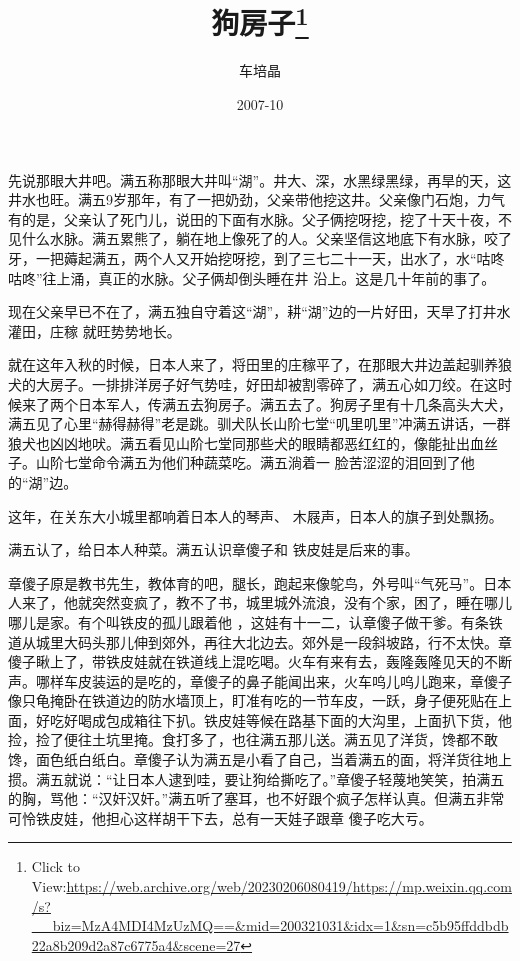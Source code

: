 \documentclass{article}
\title{狗房子\footnote{Click to View:\url{https://web.archive.org/web/20230206080419/https://mp.weixin.qq.com/s?__biz=MzA4MDI4MzUzMQ==&mid=200321031&idx=1&sn=c5b95ffddbdb22a8b209d2a87c6775a4&scene=27}}}
\author{车培晶}
\date{2007-10}
\begin{document}

\maketitle


\Large

﻿先说那眼大井吧。满五称那眼大井叫“湖”。井大、深，水黑绿黑绿，再旱的天，这井水也旺。满五9岁那年，有了一把奶劲，父亲带他挖这井。父亲像门石炮，力气有的是，父亲认了死门儿，说田的下面有水脉。父子俩挖呀挖，挖了十天十夜，不见什么水脉。满五累熊了，躺在地上像死了的人。父亲坚信这地底下有水脉，咬了牙，一把薅起满五，两个人又开始挖呀挖，到了三七二十一天，出水了，水“咕咚咕咚”往上涌，真正的水脉。父子俩却倒头睡在井
沿上。这是几十年前的事了。 

现在父亲早已不在了，满五独自守着这“湖”，耕“湖”边的一片好田，天旱了打井水灌田，庄稼
就旺势势地长。 

\newpage

就在这年入秋的时候，日本人来了，将田里的庄稼平了，在那眼大井边盖起驯养狼犬的大房子。一排排洋房子好气势哇，好田却被割零碎了，满五心如刀绞。在这时候来了两个日本军人，传满五去狗房子。满五去了。狗房子里有十几条高头大犬，满五见了心里“赫得赫得”老是跳。驯犬队长山阶七堂“叽里叽里”冲满五讲话，一群狼犬也凶凶地吠。满五看见山阶七堂同那些犬的眼睛都恶红红的，像能扯出血丝子。山阶七堂命令满五为他们种蔬菜吃。满五淌着一
脸苦涩涩的泪回到了他的“湖”边。 

这年，在关东大小城里都响着日本人的琴声、
木屐声，日本人的旗子到处飘扬。 

满五认了，给日本人种菜。满五认识章傻子和
铁皮娃是后来的事。 

章傻子原是教书先生，教体育的吧，腿长，跑起来像鸵鸟，外号叫“气死马”。日本人来了，他就突然变疯了，教不了书，城里城外流浪，没有个家，困了，睡在哪儿哪儿是家。有个叫铁皮的孤儿跟着他
\newpage
，这娃有十一二，认章傻子做干爹。有条铁道从城里大码头那儿伸到郊外，再往大北边去。郊外是一段斜坡路，行不太快。章傻子瞅上了，带铁皮娃就在铁道线上混吃喝。火车有来有去，轰隆轰隆见天的不断声。哪样车皮装运的是吃的，章傻子的鼻子能闻出来，火车呜儿呜儿跑来，章傻子像只龟掩卧在铁道边的防水墙顶上，盯准有吃的一节车皮，一跃，身子便死贴在上面，好吃好喝成包成箱往下扒。铁皮娃等候在路基下面的大沟里，上面扒下货，他捡，捡了便往土坑里掩。食打多了，也往满五那儿送。满五见了洋货，馋都不敢馋，面色纸白纸白。章傻子认为满五是小看了自己，当着满五的面，将洋货往地上掼。满五就说：“让日本人逮到哇，要让狗给撕吃了。”章傻子轻蔑地笑笑，拍满五的胸，骂他：“汉奸汉奸。”满五听了塞耳，也不好跟个疯子怎样认真。但满五非常可怜铁皮娃，他担心这样胡干下去，总有一天娃子跟章
傻子吃大亏。 
\end{document}
